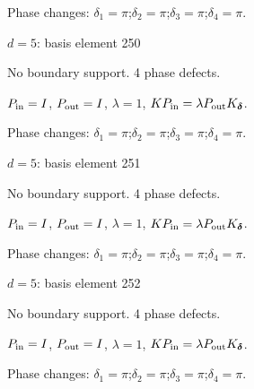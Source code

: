 \par\smallskip\begin{minipage}{.98\linewidth}\small Phase changes: $\delta_{1}=\pi$;\quad $\delta_{2}=\pi$;\quad $\delta_{3}=\pi$;\quad $\delta_{4}=\pi$.\end{minipage}
\vfill
{\footnotesize\texttt{}}
\newpage
{}
{\Large $d=5$: basis element 250}\par
No boundary support. 4 phase defects.
\begin{center}
\end{center}
\vspace{-1mm}
$P_{\rm in}=I$, \quad $P_{\rm out}=I$, \quad $\lambda=1$, \qquad $K P_{\rm in}=\lambda P_{\rm out}K_{\boldsymbol\delta}$.
\par\smallskip\begin{minipage}{.98\linewidth}\small Phase changes: $\delta_{1}=\pi$;\quad $\delta_{2}=\pi$;\quad $\delta_{3}=\pi$;\quad $\delta_{4}=\pi$.\end{minipage}
\vfill
{\footnotesize\texttt{}}
\newpage
{}
{\Large $d=5$: basis element 251}\par
No boundary support. 4 phase defects.
\begin{center}
\end{center}
\vspace{-1mm}
$P_{\rm in}=I$, \quad $P_{\rm out}=I$, \quad $\lambda=1$, \qquad $K P_{\rm in}=\lambda P_{\rm out}K_{\boldsymbol\delta}$.
\par\smallskip\begin{minipage}{.98\linewidth}\small Phase changes: $\delta_{1}=\pi$;\quad $\delta_{2}=\pi$;\quad $\delta_{3}=\pi$;\quad $\delta_{4}=\pi$.\end{minipage}
\vfill
{\footnotesize\texttt{}}
\newpage
{}
{\Large $d=5$: basis element 252}\par
No boundary support. 4 phase defects.
\begin{center}
\end{center}
\vspace{-1mm}
$P_{\rm in}=I$, \quad $P_{\rm out}=I$, \quad $\lambda=1$, \qquad $K P_{\rm in}=\lambda P_{\rm out}K_{\boldsymbol\delta}$.
\par\smallskip\begin{minipage}{.98\linewidth}\small Phase changes: $\delta_{1}=\pi$;\quad $\delta_{2}=\pi$;\quad $\delta_{3}=\pi$;\quad $\delta_{4}=\pi$.\end{minipage}
